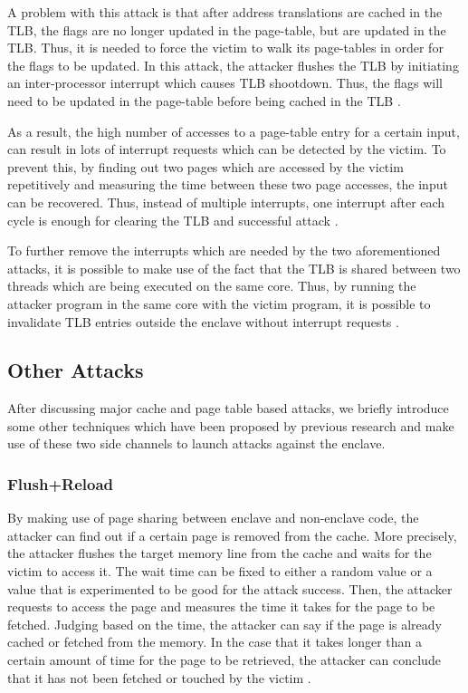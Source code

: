 A problem with this attack is that after address translations are cached in the TLB, the flags are no longer updated in the page-table, but are updated in the TLB. Thus, it is needed to force the victim to walk its page-tables in order for the flags to be updated. In this attack, the attacker flushes the TLB by initiating an inter-processor interrupt which causes TLB shootdown. Thus, the flags will need to be updated in the page-table before being cached in the TLB \cite{leakycauldron,stealthy}.

As a result, the high number of accesses to a page-table entry for a certain input, can result in lots of interrupt requests which can be detected by the victim. To prevent this, by finding out two pages which are accessed by the victim repetitively and measuring the time between these two page accesses, the input can be recovered. Thus, instead of multiple interrupts, one interrupt after each cycle is enough for clearing the TLB and successful attack \cite{leakycauldron,stealthy}.

To further remove the interrupts which are needed by the two aforementioned attacks, it is possible to make use of the fact that the TLB is shared between two threads which are being executed on the same core. Thus, by running the attacker program in the same core with the victim program, it is possible to invalidate TLB entries outside the enclave without interrupt requests \cite{leakycauldron,stealthy}.

\subsection{Other Attacks}
After discussing major cache and page table based attacks, we briefly introduce some other techniques which have been proposed by previous research and make use of these two side channels to launch attacks against the enclave.

\subsubsection{Flush+Reload}
By making use of page sharing between enclave and non-enclave code, the attacker can find out if a certain page is removed from the cache. More precisely, the attacker flushes the target memory line from the cache and waits for the victim to access it. The wait time can be fixed to either a random value or a value that is experimented to be good for the attack success. Then, the attacker requests to access the page and measures the time it takes for the page to be fetched. Judging based on the time, the attacker can say if the page is already cached or fetched from the memory. In the case that it takes longer than a certain amount of time for the page to be retrieved, the attacker can conclude that it has not been fetched or touched by the victim \cite{flushreload}.

